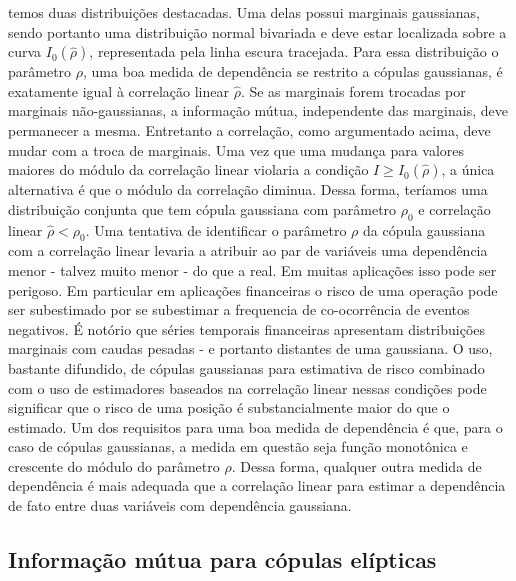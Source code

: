  temos duas distribuições destacadas. Uma delas possui marginais gaussianas, sendo portanto uma distribuição normal bivariada e deve estar localizada sobre a curva $I_{0}(\hat{\rho})$, representada pela linha escura tracejada. Para essa distribuição o parâmetro $\rho$, uma boa medida de dependência se restrito a cópulas gaussianas, é exatamente igual à correlação linear $\hat{\rho}$. Se as marginais forem trocadas por marginais não-gaussianas, a informação mútua, independente das marginais, deve permanecer a mesma. Entretanto a correlação, como argumentado acima, deve mudar com a troca de marginais. Uma vez que uma mudança para valores maiores do módulo da correlação linear violaria a condição $I\ge I_{0}(\hat{\rho})$, a única alternativa é que o módulo da correlação diminua. Dessa forma, teríamos uma distribuição conjunta que tem cópula gaussiana com parâmetro $\rho_0$ e correlação linear $\hat{\rho} < \rho_{0}$. Uma tentativa de identificar o parâmetro $\rho$ da cópula gaussiana com a correlação linear levaria a atribuir ao par de variáveis uma dependência menor - talvez muito menor - do que a real. Em muitas aplicações isso pode ser perigoso. Em particular em aplicações financeiras o risco de uma operação pode ser subestimado por se subestimar a frequencia de co-ocorrência de eventos negativos. É notório que séries temporais financeiras apresentam distribuições marginais com caudas pesadas - e portanto distantes de uma gaussiana. O uso, bastante difundido\cite{FT2009}, de cópulas gaussianas para estimativa de risco combinado com o uso de estimadores baseados na correlação linear nessas condições pode significar que o risco de uma posição é substancialmente maior do que o estimado. Um dos requisitos para uma boa medida de dependência é que, para o caso de cópulas gaussianas, a medida em questão seja função monotônica e crescente do módulo do parâmetro $\rho$. Dessa forma, qualquer outra medida de dependência é mais adequada que a correlação linear para estimar a dependência de fato entre duas variáveis com dependência gaussiana.

\subsection{Informação mútua para cópulas elípticas}

